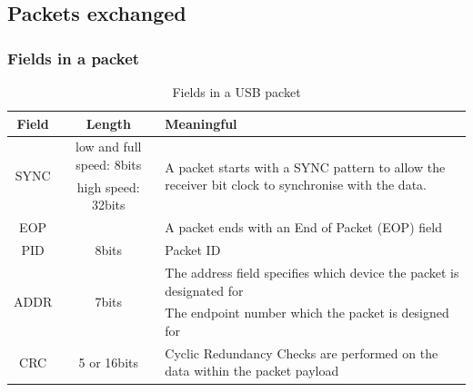\documentclass[pdftex,12pt,a4paper]{report}
\begin{document}
\newpage

\subsection{Packets exchanged}
\subsubsection{Fields in a packet}

\begin{table}[h!]
\begin{tabular}{|c|c|p{9cm}|}
\hline
Field & Length & Meaningful \\ \hline
\multirow{2}{*}{SYNC} & low and full speed: 8bits  & \multirow{2}{10cm}{A packet starts with a SYNC pattern to allow the receiver bit clock to synchronise with the data.} \\
\cline{2-2}%
 & high speed: 32bits & \\ \hline
 
EOP &  & A packet ends with an End of Packet (EOP) field \\ \hline

PID & 8bits & Packet ID \\ \hline

\multirow{2}{*}{ADDR} & \multirow{2}{*}{7bits} & The address field specifies which device the packet is designated for\\ \hline

\multirow{2}{*}{ENDP} & \multirow{2}{*}{8bits} & The endpoint number which the packet is designed for \\ \hline

\multirow{2}{*}{CRC} & \multirow{2}{*}{5 or 16bits} & Cyclic Redundancy Checks are performed on the data within the packet payload \\ \hline
\end{tabular}
\caption{Fields in a USB packet}
\label{Fields in a USB packet}
\end{table}
\end{document}

